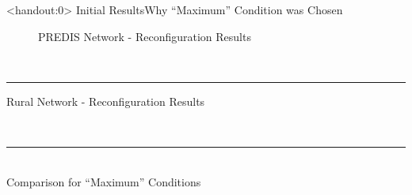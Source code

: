\documentclass[xcolor=svgnames,aspectratio=32,8pt]{beamer}
\begin{document}

\begin{frame}<handout:0>
  {Initial Results}{Why ``Maximum'' Condition was Chosen}
\begin{changemargin}{-1cm}{-1cm}
  \vspace{0.3cm}
  \begin{minipage}[!h]{0.3\paperwidth}
  \begin{figure}[!h]
  \tiny
  \centering
  \vspace{0.3cm}
  PREDIS Network - Reconfiguration Results
    \setlength\figureheight{2cm}
    \setlength\figurewidth{0.25\paperwidth}
    
    \ \\
    \setlength\figureheight{2cm}
    \setlength\figurewidth{0.25\paperwidth}
    
  \end{figure}
  \end{minipage}%
  \begin{minipage}[!h]{0.055\paperwidth}
  \vspace{0.225cm}
  \flushright
  \rule[-5mm]{0.1mm}{6.55cm}
  \end{minipage}%
  \begin{minipage}[!h]{0.625\paperwidth}
  \tiny
  \centering
    Rural Network - Reconfiguration Results
    \begin{minipage}[!h]{0.3\paperwidth}
      \centering
      \setlength\figureheight{2cm}
      \setlength\figurewidth{0.25\paperwidth}
      
    \end{minipage}%
    \begin{minipage}[!h]{0.3\paperwidth}
      \centering
      \setlength\figureheight{2cm}
      \setlength\figurewidth{0.25\paperwidth}
      
    \end{minipage}\\
    \vspace{-0.15cm}
    \begin{minipage}[!h]{0.65\paperwidth}
    \centering
    \rule[-5mm]{0.65\paperwidth}{0.12mm}\\
    \vspace{0.1cm}
    Comparison for ``Maximum'' Conditions\\
    \resizebox{0.55\paperwidth}{!}{%
      \tiny
      \centering
      \begin{tabular}{lccc}

\end{tabular}}
\end{minipage}
\end{minipage}
\end{changemargin}
\end{frame}
\end{document}
